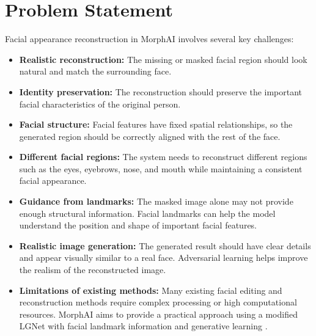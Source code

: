         \section{Problem Statement}

Facial appearance reconstruction in MorphAI involves several key challenges:

\begin{itemize}

\item \textbf{Realistic reconstruction:} The missing or masked facial region should look natural and match the surrounding face.

\item \textbf{Identity preservation:} The reconstruction should preserve the important facial characteristics of the original person.

\item \textbf{Facial structure:} Facial features have fixed spatial relationships, so the generated region should be correctly aligned with the rest of the face.

\item \textbf{Different facial regions:} The system needs to reconstruct different regions such as the eyes, eyebrows, nose, and mouth while maintaining a consistent facial appearance.

\item \textbf{Guidance from landmarks:} The masked image alone may not provide enough structural information. Facial landmarks can help the model understand the position and shape of important facial features.

\item \textbf{Realistic image generation:} The generated result should have clear details and appear visually similar to a real face. Adversarial learning helps improve the realism of the reconstructed image.

\item \textbf{Limitations of existing methods:} Many existing facial editing and reconstruction methods require complex processing or high computational resources. MorphAI aims to provide a practical approach using a modified LGNet with facial landmark information and generative learning \cite{xu2024diffuse,xu2022transeditor,tzaban2022stitch}.

\end{itemize}

